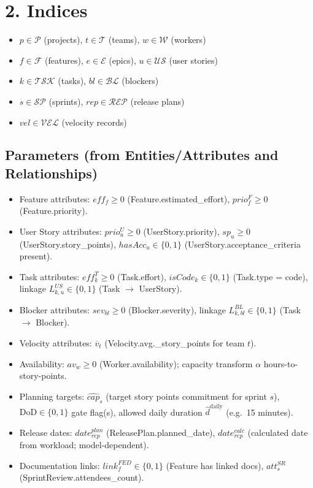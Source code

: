 \documentclass[11pt,a4paper]{article}
\begin{document}
\section{2. Indices}
\begin{itemize}[leftmargin=1.2cm]
  \item $p \in \mathcal{P}$ (projects), $t \in \mathcal{T}$ (teams), $w \in \mathcal{W}$ (workers)
  \item $f \in \mathcal{F}$ (features), $e \in \mathcal{E}$ (epics), $u \in \mathcal{US}$ (user stories)
  \item $k \in \mathcal{TSK}$ (tasks), $bl \in \mathcal{BL}$ (blockers)
  \item $s \in \mathcal{SP}$ (sprints), $rep \in \mathcal{REP}$ (release plans)
  \item $vel \in \mathcal{VEL}$ (velocity records)
\end{itemize}

\subsection*{Parameters (from Entities/Attributes and Relationships)}
\begin{itemize}[leftmargin=1.2cm]
  \item Feature attributes: $eff_f \ge 0$ (Feature.estimated\_effort), $prio^F_f \ge 0$ (Feature.priority).
  \item User Story attributes: $prio^U_u \ge 0$ (UserStory.priority), $sp_u \ge 0$ (UserStory.story\_points), $hasAcc_u \in \{0,1\}$ (UserStory.acceptance\_criteria present).
  \item Task attributes: $eff^T_k \ge 0$ (Task.effort), $isCode_k \in \{0,1\}$ (Task.type = code), linkage $L^{US}_{k,u} \in \{0,1\}$ (Task $\to$ UserStory).
  \item Blocker attributes: $sev_{bl} \ge 0$ (Blocker.severity), linkage $L^{BL}_{k,bl}\in\{0,1\}$ (Task $\to$ Blocker).
  \item Velocity attributes: $\overline{v}_{t}$ (Velocity.avg.\_story\_points for team $t$).
  \item Availability: $av_w \ge 0$ (Worker.availability); capacity transform $\alpha$ hours-to-story-points.
  \item Planning targets: $\widehat{cap}_s$ (target story points commitment for sprint $s$), $\mathrm{DoD}\in\{0,1\}$ gate flag(s), allowed daily duration $\widehat{d}^{\text{daily}}$ (e.g.\ 15 minutes).
  \item Release dates: $date^{plan}_{rep}$ (ReleasePlan.planned\_date), $date^{calc}_{rep}$ (calculated date from workload; model-dependent).
  \item Documentation links: $link^{FED}_f \in \{0,1\}$ (Feature has linked docs), $att^{SR}_s$ (SprintReview.attendees\_count).
\end{itemize}
\end{document}
